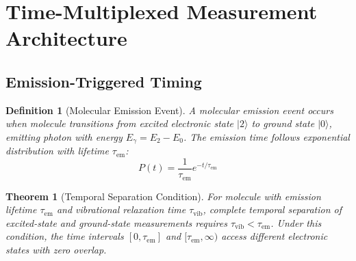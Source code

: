 \documentclass[twocolumn,10pt]{article}
\newtheorem{theorem}{Theorem}[section]
\newtheorem{definition}{Definition}[section]
\begin{document}
\section{Time-Multiplexed Measurement Architecture}

\subsection{Emission-Triggered Timing}

\begin{definition}[Molecular Emission Event]
A molecular emission event occurs when molecule transitions from excited electronic state $|2\rangle$ to ground state $|0\rangle$, emitting photon with energy $E_{\gamma} = E_2 - E_0$. The emission time follows exponential distribution with lifetime $\tau_{\text{em}}$:
\begin{equation}
P(t) = \frac{1}{\tau_{\text{em}}} e^{-t/\tau_{\text{em}}}
\end{equation}
\end{definition}

\begin{theorem}[Temporal Separation Condition]
\label{thm:temporal_separation}
For molecule with emission lifetime $\tau_{\text{em}}$ and vibrational relaxation time $\tau_{\text{vib}}$, complete temporal separation of excited-state and ground-state measurements requires $\tau_{\text{vib}} < \tau_{\text{em}}$. Under this condition, the time intervals $[0, \tau_{\text{em}}]$ and $[\tau_{\text{em}}, \infty)$ access different electronic states with zero overlap.
\end{theorem}
\end{document}
